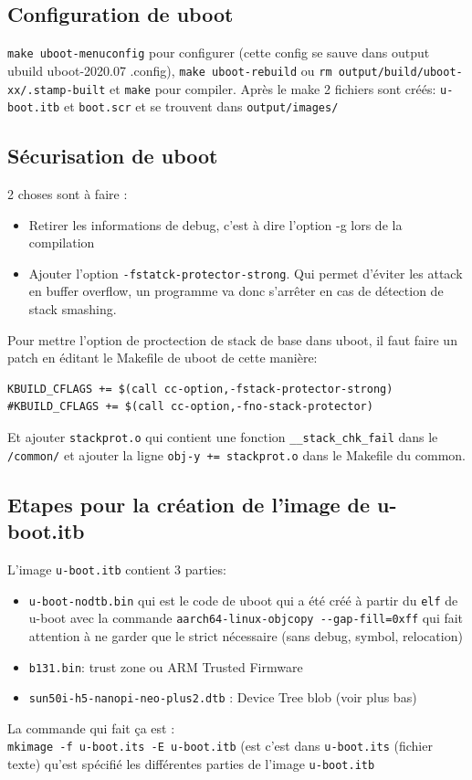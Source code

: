 \subsection{Configuration de uboot}
\verb!make uboot-menuconfig! pour configurer (cette config se sauve dans output ubuild uboot-2020.07 .config), \verb!make uboot-rebuild! ou \verb!rm output/build/uboot-xx/.stamp-built! et \verb!make! pour compiler. Après le make 2 fichiers sont créés: \verb!u-boot.itb! et \verb!boot.scr! et se trouvent dans \verb!output/images/!
\subsection{Sécurisation de uboot}
2 choses sont à faire :
\begin{itemize}
\item Retirer les informations de debug, c'est à dire l'option -g lors de la compilation
\item Ajouter l'option \verb!-fstatck-protector-strong!.  Qui permet d'éviter les attack en buffer overflow, un programme va donc s'arrêter en cas de détection de stack smashing.
\end{itemize}
Pour mettre l'option de proctection de stack de base dans uboot, il faut faire un patch en éditant le Makefile de uboot de cette manière:
\begin{Verbatim}[breaklines=true, breakanywhere=true]
KBUILD_CFLAGS += $(call cc-option,-fstack-protector-strong)
#KBUILD_CFLAGS += $(call cc-option,-fno-stack-protector)
\end{Verbatim}
Et ajouter \verb!stackprot.o! qui contient une fonction \verb!__stack_chk_fail! dans le \verb!/common/! et ajouter la ligne \verb!obj-y += stackprot.o! dans le Makefile du common.
\subsection{Etapes pour la création de l'image de u-boot.itb}
L'image \verb!u-boot.itb! contient 3 parties:
\begin{itemize}
\item \verb!u-boot-nodtb.bin!  qui est le code de uboot qui a été créé à partir du \verb!elf! de u-boot avec la commande \verb!aarch64-linux-objcopy --gap-fill=0xff! qui fait attention à ne garder que le strict nécessaire (sans debug, symbol, relocation)
\item \verb!b131.bin!: trust zone ou ARM Trusted Firmware
\item \verb!sun50i-h5-nanopi-neo-plus2.dtb! : Device Tree blob (voir plus bas)
\end{itemize}
La commande qui fait ça est : \\ \verb!mkimage -f u-boot.its -E u-boot.itb! (est c'est dans \verb!u-boot.its! (fichier texte) qu'est spécifié les différentes parties de l'image \verb!u-boot.itb!

